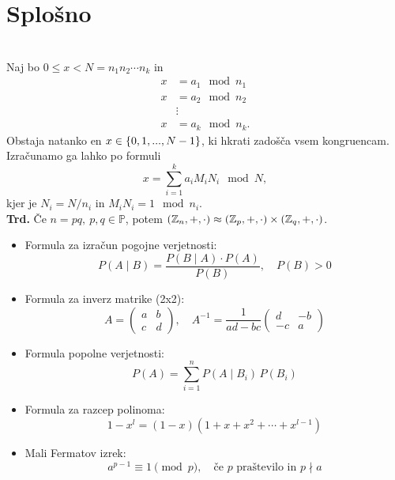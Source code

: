 \section{Splošno}
\\
Naj bo \(0 \leq x < N = n_1n_2 \cdots n_k\) in 
\begin{align*}
    x &= a_1 \mod n_1 \\
    x &= a_2 \mod n_2 \\
    &\vdots \\
    x &= a_k \mod n_k.
\end{align*}
Obstaja natanko en \(x \in \{0, 1, ..., N - 1\}\), ki hkrati zadošča vsem kongruencam. Izračunamo ga lahko po formuli
\[
    x = \sum_{i=1}^{k} a_i M_i N_i \mod N,
\]
kjer je \(N_i = N / n_i\) in \(M_i N_i = 1 \mod n_i\).\\
\textbf{Trd.} Če \(n = pq,\ p,q \in \mathbb{P}\), potem \((\mathbb{Z}_n, +, \cdot) \approx (\mathbb{Z}_p, +, \cdot) \times (\mathbb{Z}_q, +, \cdot)\).
\begin{itemize}
    \item Formula za izračun pogojne verjetnosti:
    \[
    P(A \mid B) = \frac{P(B \mid A) \cdot P(A)}{P(B)}, \quad P(B) > 0
    \]
    \item Formula za inverz matrike (2x2):
    \[
    A =
    \begin{pmatrix}
    a & b \\
    c & d
    \end{pmatrix}, \quad
    A^{-1} = \frac{1}{ad - bc}
    \begin{pmatrix}
    d & -b \\
    -c & a
    \end{pmatrix}
    \]

    \item Formula popolne verjetnosti:
    \[
    P(A) = \sum_{i=1}^{n} P(A \mid B_i)\, P(B_i)
    \]

    \item Formula za razcep polinoma:
    \[
    1 - x^l = (1 - x)(1 + x + x^2 + \cdots + x^{l-1})
    \]

    \item Mali Fermatov izrek:
    \[
    a^{p-1} \equiv 1 \pmod{p}, \quad \text{če } p \text{ praštevilo in } p \nmid a
    \]
\end{itemize}